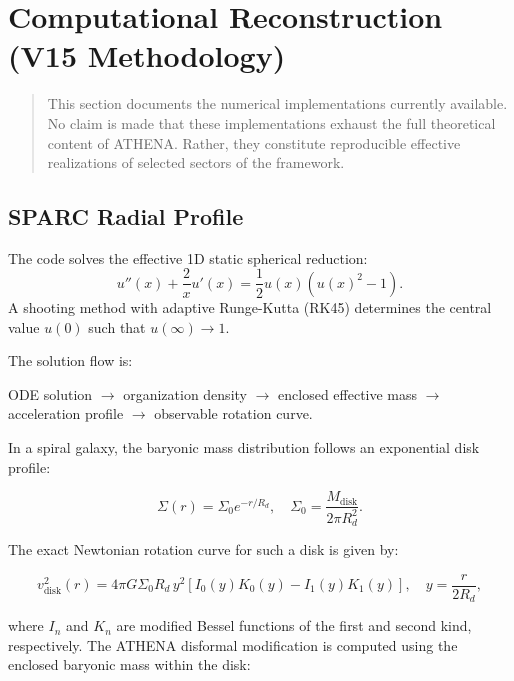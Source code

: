 \documentclass[12pt,a4paper]{article}
\numberwithin{equation}{section}
\begin{document}
\section{Computational Reconstruction (V15 Methodology)}

\begin{quote}
This section documents the numerical implementations currently available. No claim is made that these implementations exhaust the full theoretical content of ATHENA. Rather, they constitute reproducible effective realizations of selected sectors of the framework.
\end{quote}

\subsection{SPARC Radial Profile}

The code solves the effective 1D static spherical reduction:
\begin{equation}
u''(x) + \frac{2}{x} u'(x) = \frac{1}{2} u(x) \left( u(x)^2 - 1 \right).
\end{equation}
A shooting method with adaptive Runge-Kutta (RK45) determines the central value $u(0)$ such that $u(\infty) \to 1$.

The solution flow is:
\begin{center}
ODE solution $\rightarrow$ organization density $\rightarrow$ enclosed effective mass $\rightarrow$ acceleration profile $\rightarrow$ observable rotation curve.
\end{center}

In a spiral galaxy, the baryonic mass distribution follows an exponential disk profile:

\begin{equation}
\Sigma(r) = \Sigma_0 e^{-r/R_d}, \quad \Sigma_0 = \frac{M_{\text{disk}}}{2\pi R_d^2}.
\end{equation}

The exact Newtonian rotation curve for such a disk is given by:

\begin{equation}
v_{\text{disk}}^2(r) = 4\pi G \Sigma_0 R_d \, y^2 \left[ I_0(y) K_0(y) - I_1(y) K_1(y) \right], \quad y = \frac{r}{2R_d},
\end{equation}

where $I_n$ and $K_n$ are modified Bessel functions of the first and second kind, respectively. The ATHENA disformal modification is computed using the enclosed baryonic mass within the disk:
\end{document}
